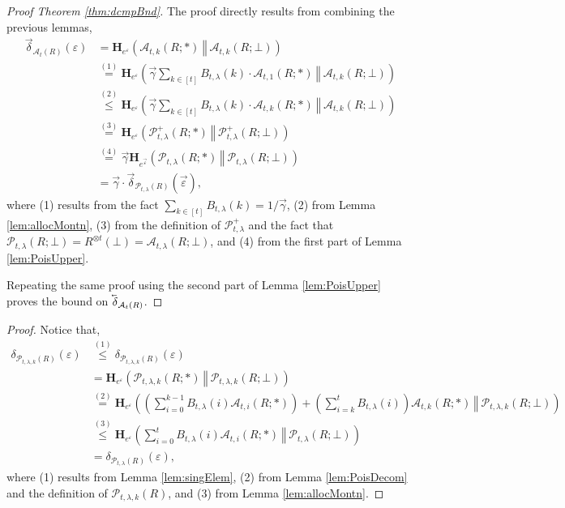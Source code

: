 \documentclass{article}
\newcommand{\Arxiv}[1]{}
\newcommand{\Arxiv}[1]{#1}
\theoremstyle{plain}
\theoremstyle{definition}
\newcommand{\eps}{\varepsilon}
\newcommand{\eqExp}[2]{\overset{(#1)}{#2}}
\newcommand{\lvec}[1]{\reflectbox{$\vec{\reflectbox{$#1$}}$}}
\newcommand{\rand}{R}
\newcommand{\HockeyStick}[1]{\boldsymbol{H}_{#1}}
\newcommand{\HockeyStickDiv}[3]{\HockeyStick{#1}\left(#2 ~\left\Vert~ #3 \right. \right)}
\newcommand{\Pois}[2]{\mathcal{P}_{#1}\left(#2\right)}
\newcommand{\PoisFunc}[3]{\mathcal{P}_{#1}\left(#2; #3\right)}
\newcommand{\alloc}[2]{\mathcal{A}_{#1}\left(#2\right)}
\newcommand{\allocFunc}[3]{\mathcal{A}_{#1}\left(#2; #3\right)}
\newcommand{\add}[1]{\lvec{#1}}
\newcommand{\rem}[1]{\vec{#1}}
\newcommand{\privProf}[1]{\delta_{#1}}
\newcommand{\privProfAdd}[1]{\add{\delta}_{#1}}
\newcommand{\privProfRem}[1]{\rem{\delta}_{#1}}
\begin{document}
\begin{proof}[Proof Theorem \ref{thm:dcmpBnd}]
    The proof directly results from combining the previous lemmas,
    \begin{align*}
        \privProfRem{\alloc{t}{\rand}}(\eps) & = \HockeyStickDiv{e^{\eps}}{\allocFunc{t, k}{\rand}{*}}{\allocFunc{t, k}{\rand}{\bot}}
        \\ & \eqExp{1}{=} \HockeyStickDiv{e^{\eps}}{\rem{\gamma} \sum_{k \in [t]} B_{t, \lambda}(k) \cdot \allocFunc{t, 1}{\rand}{*}}{\allocFunc{t, k}{\rand}{\bot}}
        \\ & \eqExp{2}{\le} \HockeyStickDiv{e^{\eps}}{\rem{\gamma} \sum_{k \in [t]} B_{t, \lambda}(k)\cdot \allocFunc{t, k}{\rand}{*}}{\allocFunc{t, k}{\rand}{\bot}}
        \\ & \eqExp{3}{=} \HockeyStickDiv{e^{\eps}}{\mathcal{P}_{t, \lambda}^{+}(\rand; *)}{\mathcal{P}_{t, \lambda}^{+}(\rand; \bot)}
        \\ & \eqExp{4}{=} \rem{\gamma} \HockeyStickDiv{e^{\rem{\eps}}}{\PoisFunc{t, \lambda}{\rand}{*}}{\PoisFunc{t, \lambda}{\rand}{\bot}}
        \\ & = \rem{\gamma} \cdot \privProfRem{\Pois{t, \lambda}{\rand}}(\rem{\eps}),
    \end{align*}
    where (1) results from the fact $\sum_{k \in [t]} B_{t, \lambda}(k) = 1/\rem{\gamma}$, (2) from Lemma \ref{lem:allocMontn}, (3) from the definition of $\mathcal{P}_{t, \lambda}^{+}$ and the fact that $\PoisFunc{t, \lambda}{\rand}{\bot} = \rand^{\otimes t}(\bot) = \allocFunc{t, \lambda}{\rand}{\bot}$, and (4) from the first part of Lemma \ref{lem:PoisUpper}.
    
    Repeating the same proof using the second part of Lemma \ref{lem:PoisUpper} proves the bound on $\privProfAdd{\alloc{t}{\rand}}$.
\end{proof}

\begin{proof}\Arxiv{[Proof of Corollary \ref{cor:TruncPois}]}
    Notice that,
    \begin{align*}
        \privProf{\Pois{t, \lambda, k}{\rand}}(\eps) & \eqExp{1}{\le} \privProf{\Pois{t, \lambda, k}{\rand}}(\eps)
        \\ & = \HockeyStickDiv{e^{\eps}}{\PoisFunc{t, \lambda, k}{\rand}{*}}{\PoisFunc{t, \lambda, k}{\rand}{\bot}}
        \\ & \eqExp{2}{=} \HockeyStickDiv{e^{\eps}}{\left(\sum_{i = 0}^{k-1} B_{t, \lambda}(i) \allocFunc{t, i}{\rand}{*} \right) + \left(\sum_{i = k}^{t} B_{t, \lambda}(i) \right) \allocFunc{t, k}{\rand}{*}}{\PoisFunc{t, \lambda, k}{\rand}{\bot}}
        \\ & \eqExp{3}{\le} \HockeyStickDiv{e^{\eps}}{\sum_{i = 0}^{t} B_{t, \lambda}(i) \allocFunc{t, i}{\rand}{*}}{\PoisFunc{t, \lambda}{\rand}{\bot}}
        \\ & = \privProf{\Pois{t, \lambda}{\rand}}(\eps),
    \end{align*}
    where (1) results from Lemma \ref{lem:singElem}, (2) from Lemma \ref{lem:PoisDecom} and the definition of $\Pois{t, \lambda, k}{\rand}$, and (3) from Lemma \ref{lem:allocMontn}.
\end{proof}
\end{document}
